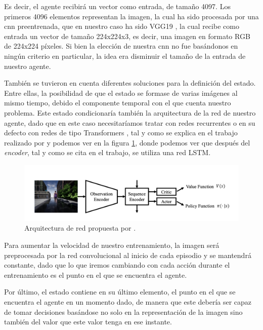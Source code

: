 Es decir, el agente recibirá un vector como entrada, de tamaño 4097. Los primeros 4096 elementos representan la imagen, la cual ha sido procesada por una \acrshort{cnn} preentrenada, que en nuestro caso ha sido VGG19 \citep{vgg19}, la cual recibe como entrada un vector de tamaño 224x224x3, es decir, una imagen en formato RGB de 224x224 píxeles. Si bien la elección de nuestra \acrshort{cnn} no fue basándonos en ningún criterio en particular, la idea era disminuir el tamaño de la entrada de nuestro agente. 
\medskip

También se tuvieron en cuenta diferentes soluciones para la definición del estado. Entre ellas, la posibilidad de que el estado se formase de varias imágenes al mismo tiempo, debido el componente temporal con el que cuenta nuestro problema. Este estado condicionaría también la arquitectura de la red de nuestro agente, dado que en este caso necesitaríamos tratar con redes recurrentes o en su defecto con redes de tipo Transformers \citep{transformers}, tal y como se explica en el trabajo realizado por \citet{luo2019end} y podemos ver en la figura \ref{fig-arquitectura-red-luo}, donde podemos ver que después del \textit{encoder}, tal y como se cita en el trabajo, se utiliza una red \acrshort{LSTM}.
\medskip

\begin{figure}[H]
    \centering
    \includegraphics[scale=0.3]{figuras/luo_network_architecture.png}
    \caption[Arquitectura de red propuesta por \citet{luo2019end}.]{Arquitectura de red propuesta por \citet{luo2019end}.}
    \label{fig-arquitectura-red-luo}
\end{figure}

Para aumentar la velocidad de nuestro entrenamiento, la imagen será preprocesada por la red convolucional al inicio de cada episodio y se mantendrá constante, dado que lo que iremos cambiando con cada acción durante el entrenamiento es el punto en el que se encuentra el agente.
\medskip

Por último, el estado contiene en su último elemento, el punto en el que se encuentra el agente en un momento dado, de manera que este debería ser capaz de tomar decisiones basándose no solo en la representación de la imagen sino también del valor que este valor tenga en ese instante.

